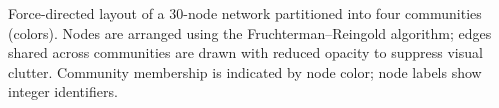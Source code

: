 \caption{Force-directed layout of a 30-node network partitioned into four communities (colors). Nodes are arranged using the Fruchterman--Reingold algorithm; edges shared across communities are drawn with reduced opacity to suppress visual clutter. Community membership is indicated by node color; node labels show integer identifiers.}
